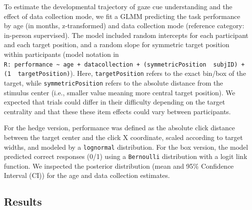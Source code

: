 \documentclass[
  man,floatsintext]{apa6}
\begin{document}
To estimate the developmental trajectory of gaze cue understanding and the effect of data collection mode, we fit a GLMM predicting the task performance by age (in months, z-transformed) and data collection mode (reference category: in-person supervised). The model included random intercepts for each participant and each target position, and a random slope for symmetric target position within participants (model notation in \texttt{R:\ performance\ \textasciitilde{}\ age\ +\ datacollection\ +\ (symmetricPosition\ \textbar{}\ subjID)\ +\ (1\ \textbar{}\ targetPosition)}). Here, \texttt{targetPosition} refers to the exact bin/box of the target, while \texttt{symmetricPosition} refers to the absolute distance from the stimulus center (i.e., smaller value meaning more central target position). We expected that trials could differ in their difficulty depending on the target centrality and that these these item effects could vary between participants.

For the hedge version, performance was defined as the absolute click distance between the target center and the click X coordinate, scaled according to target widths, and modeled by a \texttt{lognormal} distribution. For the box version, the model predicted correct responses (0/1) using a \texttt{Bernoulli} distribution with a logit link function. We inspected the posterior distribution (mean and 95\% Confidence Interval (CI)) for the age and data collection estimates.

\hypertarget{results}{%
\subsection{Results}\label{results}}
\end{document}
